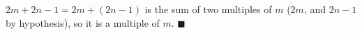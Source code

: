 $2m+2n-1=2m+(2n-1)$ is the sum of two multiples of $m$ ($2m$, and $2n-1$ by hypothesis), so it is a multiple of $m$. $\blacksquare$
